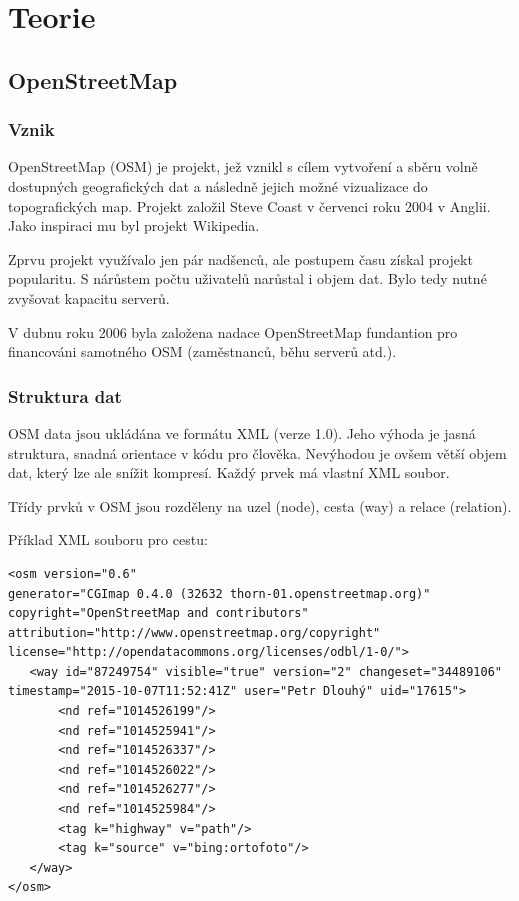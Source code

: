 \chapter{Teorie}
\label{2-Teorie}

\section{OpenStreetMap}
\label{OpenStreetMap}

\subsection{Vznik}
\label{vznik}
OpenStreetMap (OSM) je projekt, jež vznikl s cílem vytvoření a sběru 
volně dostupných geografických dat a následně jejich možné vizualizace
do topografických map. Projekt založil Steve Coast v červenci roku 
2004 v Anglii. Jako inspiraci mu byl projekt Wikipedia. 

Zprvu projekt využívalo jen pár nadšenců, ale postupem času získal 
projekt popularitu. S nárůstem počtu uživatelů narůstal i objem dat. 
Bylo tedy nutné zvyšovat kapacitu serverů. 

V dubnu roku 2006 byla založena nadace OpenStreetMap fundantion pro financováni 
samotného OSM (zaměstnanců, běhu serverů atd.). \cite{wikiOSM}


\subsection{Struktura dat}
\label{struktura dat}

OSM data jsou ukládána ve formátu XML (verze 1.0). Jeho výhoda je jasná 
struktura, snadná orientace v kódu pro člověka. Nevýhodou je ovšem větší objem 
dat, který lze ale snížit kompresí. Každý prvek má vlastní XML soubor. 

Třídy prvků v OSM jsou rozděleny na uzel (node), cesta (way) a 
relace (relation).

Příklad XML souboru pro cestu:

{\scriptsize
\begin{lstlisting}
<osm version="0.6" 
generator="CGImap 0.4.0 (32632 thorn-01.openstreetmap.org)" copyright="OpenStreetMap and contributors" attribution="http://www.openstreetmap.org/copyright" license="http://opendatacommons.org/licenses/odbl/1-0/">
   <way id="87249754" visible="true" version="2" changeset="34489106" timestamp="2015-10-07T11:52:41Z" user="Petr Dlouhý" uid="17615">
       <nd ref="1014526199"/>
       <nd ref="1014525941"/>
       <nd ref="1014526337"/>
       <nd ref="1014526022"/>
       <nd ref="1014526277"/>
       <nd ref="1014525984"/>
       <tag k="highway" v="path"/>
       <tag k="source" v="bing:ortofoto"/>
   </way>
</osm>
\end{lstlisting}
}


